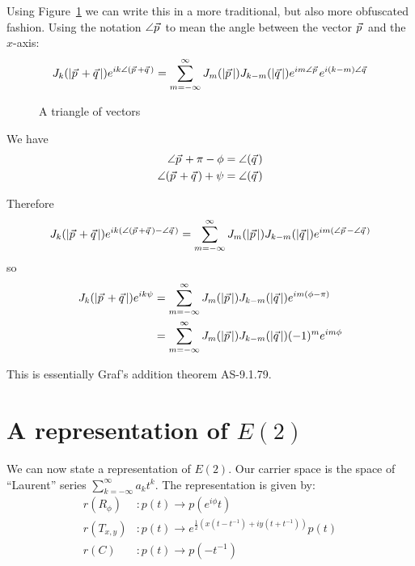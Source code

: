 \documentclass{article}
\newcommand\myvec[1]{\vec{#1}\hspace{0.5mm}}
\begin{document}
Using Figure~\ref{triangle} we can write this in a more traditional, but also more obfuscated fashion.
Using the notation $\angle\myvec{p}$ to mean the angle between the vector $\myvec{p}$ and the $x$-axis:
\[
J_k(|\myvec{p}+\myvec{q}|)e^{ik\angle(\myvec{p}+\myvec{q})} = \sum_{m=-\infty}^\infty J_m(|\myvec{p}|)J_{k-m}(|\myvec{q}|)e^{im\angle\myvec{p}}e^{i(k-m)\angle\myvec{q}}
\]


\begin{figure}
\centering
{}
\caption{A triangle of vectors}
\label{triangle}
\end{figure}

We have
\begin{align*}
\angle\myvec{p}+\pi-\phi & = \angle(\myvec{q}) \\
\angle(\myvec{p}+\myvec{q})+\psi & = \angle(\myvec{q}) 
\end{align*}

Therefore
\[
J_k(|\myvec{p}+\myvec{q}|)e^{ik(\angle(\myvec{p}+\myvec{q})-\angle\myvec{q})} = \sum_{m=-\infty}^\infty J_m(|\myvec{p}|)J_{k-m}(|\myvec{q}|)e^{im(\angle\myvec{p}-\angle\myvec{q})}
\]
so
\begin{align*}
J_k(|\myvec{p}+\myvec{q}|)e^{ik\psi} & = \sum_{m=-\infty}^\infty J_m(|\myvec{p}|)J_{k-m}(|\myvec{q}|)e^{im(\phi-\pi)} \\
                                 & = \sum_{m=-\infty}^\infty J_m(|\myvec{p}|)J_{k-m}(|\myvec{q}|)(-1)^me^{im\phi}
\end{align*}

This is essentially Graf's addition theorem AS-9.1.79.

\section{A representation of $E(2)$}
We can now state a representation of $E(2)$.
Our carrier space is the space of ``Laurent'' series $\sum_{k=-\infty}^\infty a_kt^k$.
The representation is given by:
\begin{align*}
r(R_\phi) & : p(t) \rightarrow p(e^{i\phi}t)\\
r(T_{x,y}) & : p(t) \rightarrow e^{\frac{1}{2}(x(t-t^{-1})+iy(t+t^{-1}))}p(t) \\
r(C) & : p(t) \rightarrow p(-t^{-1})
\end{align*}
\end{document}
